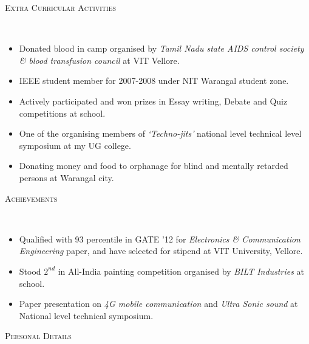 \documentclass[9pt]{article}
\newenvironment{changemargin}[2]{%
  \begin{list}{}{%
    \setlength{\topsep}{0pt}%
    \setlength{\leftmargin}{#1}%
    \setlength{\rightmargin}{#2}%
    \setlength{\listparindent}{\parindent}%
    \setlength{\itemindent}{\parindent}%
    \setlength{\parsep}{\parskip}%
  }%
  \item[]}{\end{list}
}
\newcommand{\lineover}{
	\begin{changemargin}{-0.05in}{-0.05in}
		\vspace*{-8pt}
		\hrulefill \\
		\vspace*{-2pt}
	\end{changemargin}
}
\newcommand{\header}[1]{
	\begin{changemargin}{-0.5in}{-0.5in}
		\scshape{#1}\\
  	\lineover
	\end{changemargin}
}
\newenvironment{body} {
	\vspace*{-16pt}
	\begin{changemargin}{-0.25in}{-0.5in}
  }	
	{\end{changemargin}
}
\begin{document}
\smallskip





\header{Extra Curricular Activities}

\begin{body}
	\vspace{14pt}
	\begin{itemize}
	\item Donated blood in camp organised by \emph{Tamil Nadu state AIDS control society \& blood transfusion council} at VIT Vellore.
	\item IEEE student member for 2007-2008 under NIT Warangal student zone.
	\item Actively participated and won prizes in Essay writing, Debate and Quiz competitions at school.
	\item One of the organising members of \emph{`Techno-jits'} national level technical level symposium at my UG college.
	\item Donating money and food to orphanage for blind and mentally retarded persons at Warangal city. 
	\end{itemize}
\end{body}

\smallskip
\pagebreak

\header{Achievements}

\begin{body}
	\vspace{14pt}
	\begin{itemize}
	\item Qualified with 93 percentile in GATE '12 for \emph{Electronics \& Communication Engineering} paper, and have selected for stipend at VIT University, Vellore.
	\item Stood $2^{nd}$ in All-India painting competition organised by \emph{BILT Industries} at school.
	\item Paper presentation on \emph{4G mobile communication} and \emph{Ultra Sonic sound} at National level technical symposium.
	\end{itemize}
\end{body}

\smallskip

\header{Personal Details}
\end{document}

